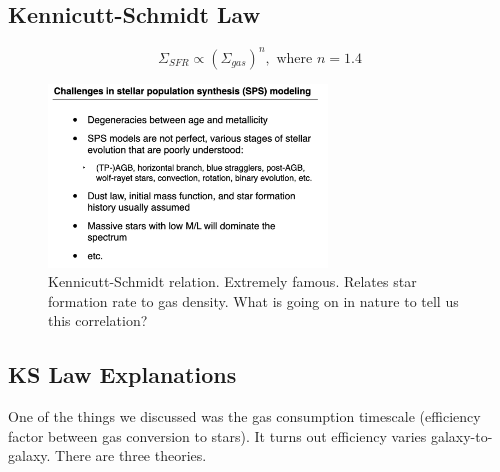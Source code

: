 \documentclass{article}
\begin{document}
\subsection{Kennicutt-Schmidt Law}

\begin{equation}
    \Sigma_{SFR} \propto \left(\Sigma_{gas}\right)^n, \text{ where } n =1.4
\end{equation}


\begin{figure}
    \centering
    \includegraphics[width=0.66\textwidth]{figs/Screen Shot 2021-09-24 at 9.35.27 AM.png}
    \caption{Kennicutt-Schmidt relation. Extremely famous.  Relates star formation rate to gas density. What is going on in nature to tell us this correlation?}
    \label{fig:KSR}
\end{figure}

\subsection{KS Law Explanations}

One of the things we discussed was the gas consumption timescale (efficiency factor between gas conversion to stars). It turns out efficiency varies galaxy-to-galaxy. There are three theories.
\end{document}
